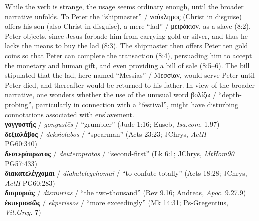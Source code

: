\begin{small}
{\noindent{}While the verb is strange, the usage seems ordinary enough, %
until the broader narrative unfolds. %
To Peter the “shipmaster” / ναύκληρος (Christ in disguise) offers his son (also Christ in disguise), %
a mere “lad” / μειράκιον, as a slave (8:2). %
Peter objects, since Jesus forbade him from %
carrying gold or silver, and thus he lacks the means to buy the lad (8:3). %
The shipmaster then offers Peter ten gold coins so that Peter can complete the transaction (8:4), %
persuading him to accept the monetary and human gift, %
and even providing a bill of sale (8:5--6). %
The bill stipulated that the lad, here named “Messias” / Μεσσίαν, %
would serve Peter until Peter died, and thereafter would be returned to his father. %
In view of the broader narrative, %
one wonders whether the use of the unusual word βολίζω / “depth-probing”, %
particularly in connection with a “festival”, %
might have disturbing connotations associated with enslavement. %
} \\[0.4mm] %
\noindent{}\textbf{γογγυστής} / \textit{gongustēs} / “grumbler” (Jude 1:16; Euseb, \textit{Isa.com.} 1.97) \\[0.4mm] %
\noindent{}\textbf{δεξιολάβος} / \textit{deksiolabos} / “spearman” (Acts 23:23; JChrys, \textit{ActH} \\\makebox[3em][l]{}PG60:340) \\[0.4mm] %
\noindent{}\textbf{δευτερόπρωτος} / \textit{deuteroprōtos} / “second-first” (Lk 6:1; JChrys, \textit{MtHom90} \\\makebox[3em][l]{}PG57:433) \\[0.4mm] %
\noindent{}\textbf{διακατελέγχομαι} / \textit{diakatelegchomai} / “to confute totally” (Acts 18:28; JChrys, \\\makebox[3em][l]{}\textit{ActH} PG60:283) \\[0.4mm]
\noindent{}\textbf{δισμυριάς} / \textit{dismurias} / “the two-thousand” %
(Rev 9.16; Andreas, \textit{Apoc.} 9.27.9) \\[0.4mm] %
\noindent{}\textbf{ἐκπερισσῶς} / \textit{ekperissōs} / “more exceedingly” (Mk 14:31; Ps-Gregentius, \\\makebox[3em][l]{}\textit{Vit.Greg.} 7) \\ %

\end{small}
